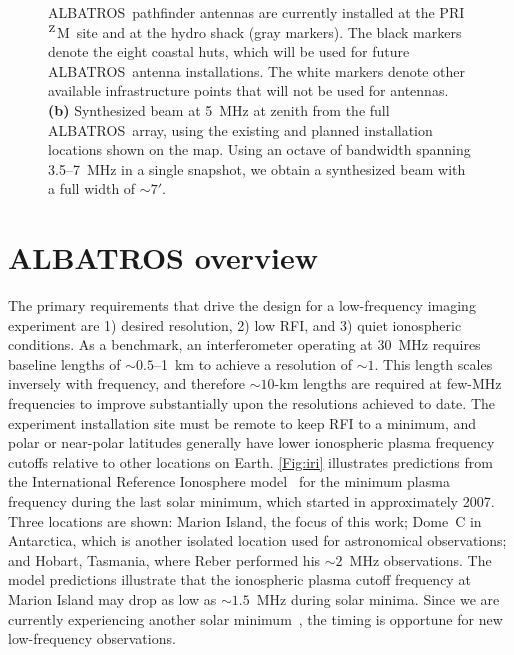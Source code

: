 \documentclass{ws-jai}
\def\albatros{ALBATROS}
\def\prizm{PRI$^{\rm Z}$M}
\begin{document}
\begin{figure}
{      \albatros\ pathfinder antennas are currently installed at the
      \prizm\ site and at the hydro shack (gray markers).  The black
      markers denote the eight coastal huts, which will be used for
      future \albatros\ antenna installations.  The white markers
      denote other available infrastructure points that will not be
      used for antennas.  {\bf (b)} Synthesized beam at 5~MHz at zenith from the
      full \albatros\ array, using the existing and planned
      installation locations shown on the map.  Using an octave of
      bandwidth spanning 3.5--7~MHz in a single snapshot, we obtain a synthesized beam with 
      a full width of $\sim7'$.}\label{Fig:marion_map_beam}
\end{figure}

\section{ALBATROS overview}

The primary requirements that drive the design for a low-frequency
imaging experiment are 1) desired resolution, 2) low RFI, and 3) quiet
ionospheric conditions.  As a benchmark, an interferometer operating
at 30~MHz requires baseline lengths of $\sim0.5$--1~km 
to achieve a resolution of $\sim 1$\degree.  This length scales
inversely with frequency, and therefore $\sim 10$-km lengths are
required at few-MHz frequencies to improve substantially upon the resolutions
achieved to date.  The experiment installation site must be remote to
keep RFI to a minimum, and polar or near-polar latitudes generally
have lower ionospheric plasma frequency cutoffs relative to other
locations on Earth.  \autoref{Fig:iri} illustrates predictions from
the International Reference Ionosphere
model~\citep{2018AdRS...16....1B} for the minimum plasma frequency
during the last solar minimum, which started in approximately 2007.
Three locations are shown: Marion Island, the focus of this work;
Dome~C in Antarctica, which is another isolated location used for
astronomical observations; and Hobart, Tasmania, where Reber performed
his $\sim2$~MHz observations.  The model predictions illustrate that
the ionospheric plasma cutoff frequency at Marion Island may drop as
low as $\sim1.5$~MHz during solar minima.  Since we are currently
experiencing another solar minimum~\citep{2018NatCo...9.5209B}, the
timing is opportune for new low-frequency observations.
\end{document}
